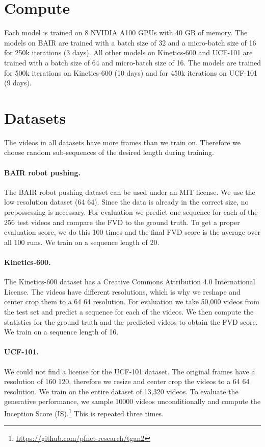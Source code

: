 \documentclass[10pt]{article} \usepackage[accepted]{tmlr}
\newcommand{\textapproxx}{\raisebox{0.5ex}{\texttildelow}}
\begin{document}
\section{Compute}
\label{sec:compute}
Each model is trained on 8 NVIDIA A100 GPUs with 40 GB of memory. The models on BAIR are trained with a batch size of 32 and a micro-batch size of 16 for 250k iterations (\textapproxx 3 days). All other models on Kinetics-600 and UCF-101 are trained with a batch size of 64 and micro-batch size of 16. The models are trained for 500k iterations on Kinetics-600 (\textapproxx 10 days) and for 450k iterations on UCF-101 (\textapproxx 9 days).



\section{Datasets}
\label{sec:datasets}
The videos in all datasets have more frames than we train on. Therefore we choose random sub-sequences of the desired length during training.

\paragraph{BAIR robot pushing.} The BAIR robot pushing dataset can be used under an MIT license. We use the low resolution dataset (64  64). Since the data is already in the correct size, no prepossessing is necessary. For evaluation we predict one sequence for each of the 256 test videos and compare the FVD to the ground truth. To get a proper evaluation score, we do this 100 times and the final FVD score is the average over all 100 runs. We train on a sequence length of 20. 

\paragraph{Kinetics-600.} The Kinetics-600 dataset has a Creative Commons Attribution 4.0 International License. The videos have different resolutions, which is why we reshape and center crop them to a 64  64 resolution. For evaluation we take 50,000 videos from the test set and predict a sequence for each of the videos. We then compute the statistics for the ground truth and the predicted videos to obtain the FVD score. We train on a sequence length of 16.

\paragraph{UCF-101.} We could not find a license for the UCF-101 dataset. The original frames have a resolution of 160  120, therefore we resize and center crop the videos to a 64  64 resolution. We train on the entire dataset of 13,320 videos. To evaluate the generative performance, we sample 10000 videos unconditionally and compute the Inception Score (IS).\footnote{\url{https://github.com/pfnet-research/tgan2}} This is repeated three times.
\end{document}
